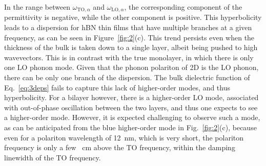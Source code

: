 \documentclass[aps,prb,twocolumn,
	           groupedaddress,superscriptaddress,
               amsfonts,amssymb,amsmath,floatfix,
	           citeautoscript]{revtex4-1}
\begin{document}
In the range between $\omega_{\mathrm{TO}, \alpha}$ and $\omega_{\mathrm{LO}, \alpha}$, the corresponding component of the permittivity is negative, while the other component is positive. This hyperbolicity leads to a dispersion for hBN thin films that have multiple branches at a given frequency, as can be seen in Figure~\ref{fig:2}(c).  This trend persists even when the thickness of the bulk is taken down to a single layer, albeit being pushed to high wavevectors. This is in contrast with the true monolayer, in which there is only one LO phonon mode. Given that the phonon polariton of 2D is the LO phonon, there can be only one branch of the dispersion. The bulk dielectric function of Eq.~\eqref{eq:3deps} fails to capture this lack of higher-order modes, and thus hyperbolicity. For a bilayer however, there is a higher-order LO mode, associated with out-of-phase oscillation between the two layers, and thus one expects to see a higher-order mode. However, it is expected challenging to observe such a mode, as can be anticipated from the blue higher-order mode in Fig.~\ref{fig:2}(c), because even for a polariton wavelength of \SI{12}{\nm}, which is very short, the polariton frequency is only a few \si{\per\cm} above the TO frequency, within the damping linewidth of the TO frequency. %
\end{document}
